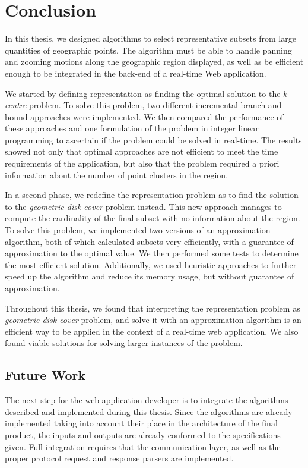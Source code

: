 \cleardoublepage
\chapter{Conclusion}
\label{chap:conc}
\vspace{-15pt}
In this thesis, we designed algorithms to select representative subsets from large quantities of geographic points. The algorithm must be able to handle panning and zooming motions along the geographic region displayed, as well as be efficient enough to be integrated in the back-end of a real-time Web application. 

We started by defining representation as finding the optimal solution to the \emph{$k$-centre} problem. To solve this problem, two different incremental branch-and-bound approaches were implemented. We then compared the performance of these approaches and one formulation of the problem in integer linear programming to ascertain if the problem could be solved in real-time. The results showed not only that optimal approaches are not efficient to meet the time requirements of the application, but also that the problem required a priori information about the number of point clusters in the region.

In a second phase, we redefine the representation problem as to find the solution to the \emph{geometric disk cover} problem instead. This new approach manages to compute the cardinality of the final subset with no information about the region. To solve this problem, we implemented two versions of an approximation algorithm, both of which calculated subsets very efficiently, with a guarantee of approximation to the optimal value. We then performed some tests to determine the most efficient solution. Additionally, we used heuristic approaches to further speed up the algorithm and reduce its memory usage, but without guarantee of approximation.

Throughout this thesis, we found that interpreting the representation problem as \emph{geometric disk cover} problem, and solve it with an approximation algorithm is an efficient way to be applied in the context of a real-time web application. We also found viable solutions for solving larger instances of the problem.

\section{Future Work}
The next step for the web application developer is to integrate the algorithms described and implemented during this thesis. Since the algorithms are already implemented taking into account their place in the architecture of the final product, the inputs and outputs are already conformed to the specifications given. Full integration requires that the communication layer, as well as the proper protocol request and response parsers are implemented.

